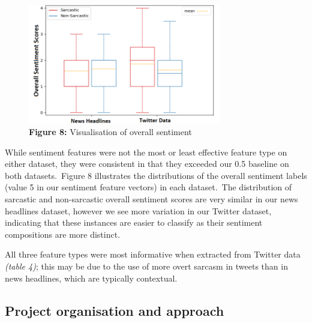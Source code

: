 \documentclass[12pt,a4paper]{article}
\begin{document}
\begin{minipage}{0.5\textwidth}
	\begin{figure}[H]
		\begin{center}
			\includegraphics[width=0.75\textwidth]{Images/boxcompare.png}\\
			\textbf{Figure 8:} Visualisation of overall sentiment\\
		\end{center}
	\end{figure}
\end{minipage}\vspace{-3pt}
\begin{minipage}{0.5\textwidth}
While sentiment features were not the most or least effective feature type on either dataset, they were consistent in that they exceeded our 0.5 baseline on both datasets.\ Figure 8 illustrates the distributions of the overall sentiment labels (value 5 in our sentiment feature vectors) in each dataset.\ The distribution of sarcastic and non-sarcastic overall sentiment scores are very similar in our news headlines dataset, however we see more variation in our Twitter dataset, indicating that these instances are easier to classify as their sentiment compositions are more distinct.
\end{minipage}\vspace{-3pt}

\noindent All three feature types were most informative when extracted from Twitter data \textit{(table 4)}; this may be due to the use of more overt sarcasm in tweets than in news headlines, which are typically contextual. 



\subsection{Project organisation and approach}\vspace{-10pt}
\end{document}
